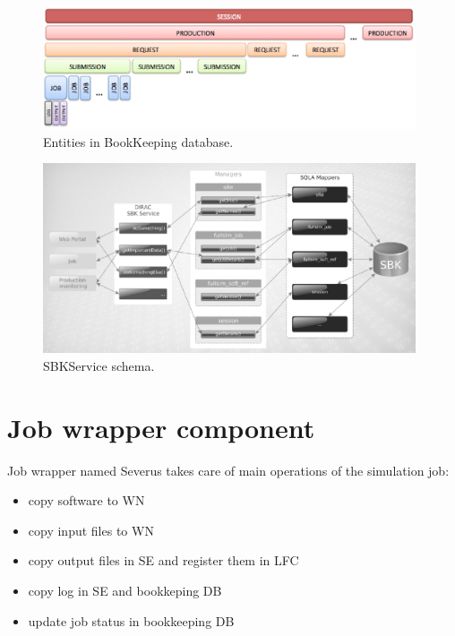 \documentclass[a4paper]{jpconf}
\begin{document}
\begin{figure}[h]
\includegraphics[width=26pc]{img/BK_entities.eps}\hspace{2pc}%
\caption{\label{fig:BK_entities}Entities in BookKeeping database.}
\end{figure}

\begin{figure}[h]
\includegraphics[width=26pc]{img/SBKService.eps}\hspace{2pc}%
\caption{\label{fig:SBKService}SBKService schema.}
\end{figure}
 
\section{Job wrapper component}
\label{sec:severus}

Job wrapper named Severus takes care of main operations of the simulation job:
\begin{itemize}
\item copy software to WN
\item copy input files to WN
\item copy output files in SE and register them in LFC
\item copy log in SE and bookkeping DB
\item update job status in bookkeeping DB
\end{itemize}
\end{document}
